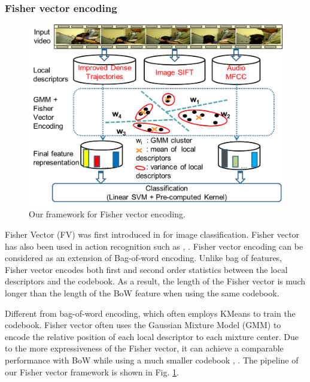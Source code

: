 \documentclass[twocolumn]{bmcart}%
\begin{document}
\subsubsection{Fisher vector encoding}
\begin{figure}
	\centering
	\includegraphics[width=2\linewidth,height=1\linewidth]{Images/framework_fv.png}
	\caption{Our framework for Fisher vector encoding.}
	\label{fig:fv_encoding}
\end{figure}
Fisher Vector (FV) was first introduced in \cite{jaakkola1999exploiting} for image classification. Fisher vector has also been used in action recognition such as \cite{sun2013large}, \cite{wang2013action}. Fisher vector encoding can be considered as an extension of Bag-of-word encoding. Unlike bag of features, Fisher vector encodes both first and second order statistics between the local descriptors and the codebook. As a result, the length of the Fisher vector is much longer than the length of the BoW feature when using the same codebook. 

Different from bag-of-word encoding, which often employs KMeans to train the codebook. Fisher vector often uses the Gaussian Mixture Model (GMM) to encode the relative position of each local descriptor to each mixture center. Due to the more expressiveness of the Fisher vector, it can achieve a comparable performance with BoW while using a much smaller codebook \cite{sanchez2013image}, \cite{sun2013large}. The pipeline of our Fisher vector framework is shown in Fig. \ref{fig:fv_encoding}.
\end{document}
